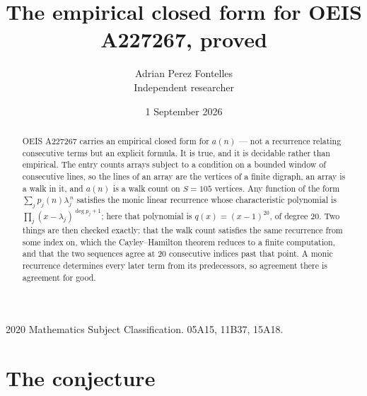 \documentclass[11pt,a4paper]{article}
\title{The empirical closed form for OEIS A227267, proved}
\author{Adrian Perez Fontelles\\ \small Independent researcher}
\date{1 September 2026}
\theoremstyle{plain}
\theoremstyle{definition}
\begin{document}
\maketitle

\begin{abstract}
OEIS A227267 carries an empirical closed form for $a(n)$ --- not a recurrence relating
consecutive terms but an explicit formula. It is true, and it is decidable rather than
empirical. The entry counts arrays subject to a condition on a bounded window of consecutive lines, so the lines of an array are the
vertices of a finite digraph, an array is a walk in it, and $a(n)$ is a walk count on
$S=105$ vertices. Any function of the form $\sum_j p_j(n)\lambda_j^{\,n}$ satisfies the
monic linear recurrence whose characteristic polynomial is
$\prod_j(x-\lambda_j)^{\deg p_j+1}$; here that polynomial is $q(x)=(x-1)^{20}$, of degree
$20$. Two things are then checked exactly: that the walk count satisfies the same
recurrence from some index on, which the Cayley--Hamilton theorem reduces to a finite
computation, and that the two sequences agree at $20$ consecutive indices past that
point. A monic recurrence determines every later term from its predecessors, so agreement
there is agreement for good.
\end{abstract}

\noindent\small 2020 Mathematics Subject Classification. 05A15, 11B37, 15A18.\normalsize

\section{The conjecture}
\end{document}
